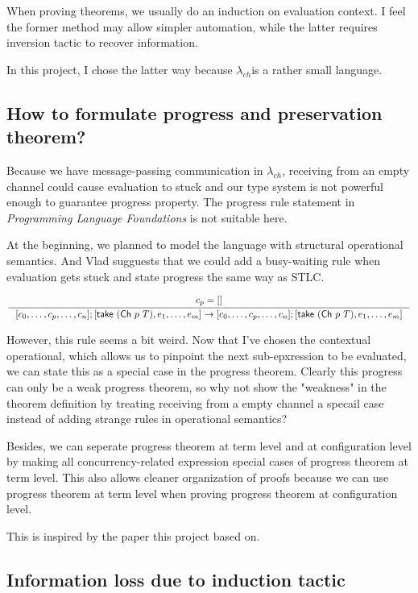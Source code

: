 \documentclass{article}
\newcommand{\lambdach}{$\lambda_{ch}$}
\newcommand{\sco}[1]{\textsf{#1}}
\newcommand{\take}[1]{\sco{take } #1}
\newcommand{\channel}[2]{\sco{Ch }#1\ #2}
\begin{document}
When proving theorems, we usually do an induction on evaluation context. I feel the former method may allow simpler
automation, while the latter requires \sco{inversion} tactic to recover information.

In this project, I chose the latter way because \lambdach is a rather small language.

\subsection{How to formulate progress and preservation theorem?}

Because we have message-passing communication in \lambdach, receiving from an empty channel could cause
evaluation to stuck and our type system is not powerful enough to guarantee progress property.
The progress rule statement in \textit{Programming Language Foundations} is not
suitable here.

At the beginning, we planned to model the language with structural operational semantics.
And Vlad sugguests that we could add a busy-waiting rule when evaluation gets stuck and state
progress the same way as STLC.

\begin{gather*}
    \inference{
        c_p = []
    }{
        [c_0,\dots,c_p,\dots,c_n];[\take{(\channel{p}{T})},e_1,\dots,e_m] ->
        [c_0,\dots,c_p,\dots,c_n];[\take{(\channel{p}{T})},e_1,\dots,e_m]
    }
\end{gather*}

However, this rule seems a bit weird. Now that I've chosen the contextual operational, which allows us to
pinpoint the next sub-epxression to be evaluated, we can state this as a special case in the progress theorem.
Clearly this progress can only be a weak progress theorem, so why not show the "weakness" in the theorem
definition by treating receiving from a empty channel a specail case instead of adding strange rules in operational
semantics?

Besides, we can seperate progress theorem at term level and at configuration level by making all
concurrency-related expression special cases of progress theorem at term level. This also allows cleaner
organization of proofs because we can use progress theorem at term level when proving progress theorem at
configuration level.

This is inspired by the paper\cite{fowler2019typed} this project based on.

\subsection{Information loss due to \sco{induction} tactic}
\end{document}
